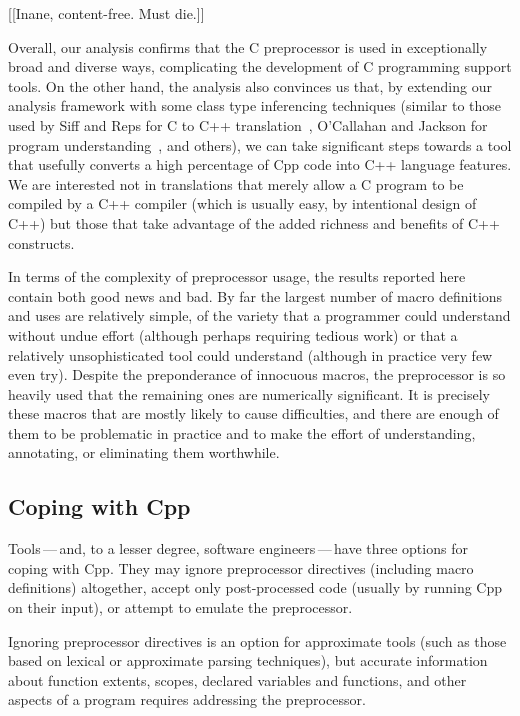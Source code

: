 \documentclass[10pt]{article}
\begin{document}
[[Inane, content-free.  Must die.]]

Overall, our analysis confirms that the C preprocessor is used in
exceptionally broad and diverse ways, complicating the development of C
programming support tools.  On the other hand, the analysis also convinces
us that, by extending our analysis framework with some class type
inferencing techniques (similar to those used by Siff and Reps for C to C++
translation~\cite{Siff-fse96}, O'Callahan and Jackson for program
understanding~\cite{OCallahan-icse97}, and others), we can take significant
steps towards a tool that usefully converts a high percentage of Cpp code
into C++ language features.  We are interested not in translations
that merely allow a C program to be compiled by a C++ compiler (which is
usually easy, by intentional design of C++) but those that take advantage
of the added richness and benefits of C++ constructs.

In terms of the complexity of preprocessor usage, the results reported here
contain both good news and bad.  By far
the largest number of macro definitions and uses are relatively simple, of
the variety that a programmer could understand without undue effort (although
perhaps requiring tedious work) or that a relatively unsophisticated tool
could understand (although in practice very few even try).  Despite the
preponderance of innocuous macros, the preprocessor is so heavily used that
the remaining ones are numerically significant.  It is precisely these
macros that are mostly likely to cause difficulties, and there are enough
of them to be problematic in practice and to make the effort of
understanding, annotating, or eliminating them worthwhile.


\subsection{Coping with Cpp}

Tools\,---\,and, to a lesser degree, software engineers\,---\,have three
options for coping with Cpp.    They may ignore preprocessor directives
(including macro definitions) altogether, accept only post-processed code
(usually by running Cpp on their input), or attempt to emulate the
preprocessor.

Ignoring preprocessor directives is an option for approximate tools (such
as those based on lexical or approximate parsing techniques), but accurate
information about function extents, scopes, declared variables and
functions, and other aspects of a program requires addressing the
preprocessor.
\end{document}
